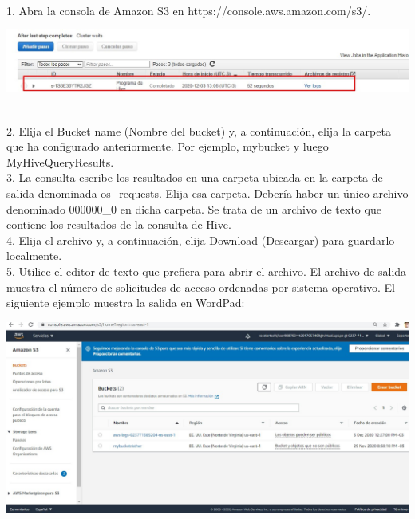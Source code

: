 \documentclass[12pt,letterpaper]{article}
\begin{document}
\begin{enumerate}
\begin{enumerate}
	\\ 1. Abra la consola de Amazon S3 en https://console.aws.amazon.com/s3/.
	\begin{center}
		\includegraphics[width=14cm]{./img/4.5.jpg} 
	\end{center}
\\ 	2. Elija el Bucket name (Nombre del bucket) y, a continuación, elija la carpeta que ha configurado
	anteriormente. Por ejemplo, mybucket y luego MyHiveQueryResults.
	\\ 3. La consulta escribe los resultados en una carpeta ubicada en la carpeta de salida denominada
	os_requests. Elija esa carpeta. Debería haber un único archivo denominado 000000_0 en dicha
	carpeta. Se trata de un archivo de texto que contiene los resultados de la consulta de Hive.
	\\ 4. Elija el archivo y, a continuación, elija Download (Descargar) para guardarlo localmente.
	\\ 5. Utilice el editor de texto que prefiera para abrir el archivo. El archivo de salida muestra el número
	de solicitudes de acceso ordenadas por sistema operativo. El siguiente ejemplo muestra la salida en
	WordPad:
	\begin{center}
		\includegraphics[width=14cm]{./img/4.6.1.jpg} 
	\end{center}
    \begin{center}

\end{center}
\end{enumerate}
\end{enumerate}
\end{document}
